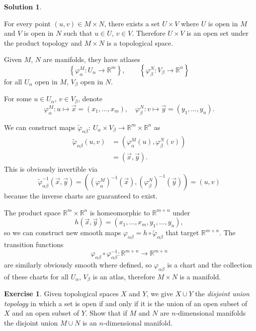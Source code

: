 \documentclass[11pt, a4paper]{report}
\theoremstyle{definition}
\newtheorem{exercise}{Exercise}[part]
\newtheorem{solution}{Solution}[part]
\newenvironment{ex}{\begin{exercise}}{\end{exercise}\pagebreak[1]}
\newenvironment{sol}{\begin{solution}}{\end{solution}\pagebreak[3]}
\begin{document}
\begin{sol}\label{sol:producttopology}

For every point $(u, v) \in M \times N$, there exists a set $U \times V$ where $U$ is open in $M$ and $V$ is open in $N$ such that $u \in U$, $v \in V$.
Therefore $U \times V$ is an open set under the product topology and $M \times N$ is a topological space.

Given $M$, $N$ are manifolds, they have atlases
\[
    \left\{\varphi^M_\alpha: U_\alpha \to \mathbb{R}^m \right\}, \qquad
    \left\{\varphi^N_\beta: V_\beta \to \mathbb{R}^n \right\}
\]
for all $U_\alpha$ open in $M$, $V_\beta$ open in $N$.

For some $u \in U_\alpha$, $v \in V_\beta$, denote
\[
    \varphi^M_\alpha: u \mapsto \vec{x} = (x_1, \ldots, x_m), \quad
    \varphi^N_\beta: v \mapsto \vec{y} = (y_1, \ldots, y_n).
\]

We can construct maps $\tilde{\varphi}_{\alpha\beta}:\ U_\alpha \times V_\beta \to \mathbb{R}^m \times \mathbb{R}^n$ as
\begin{align*}
    \tilde{\varphi}_{\alpha\beta} (u, v) &= \left(\varphi^M_\alpha(u), \varphi^N_\beta(v)\right) \\
        &= (\vec{x}, \vec{y}).
\end{align*}
This is obviously invertible via
\[
    \tilde{\varphi}_{\alpha\beta}^{-1}(\vec{x}, \vec{y}) = \left({(\varphi^M_\alpha)}^{-1}(\vec{x}), {(\varphi^N_\beta)}^{-1}(\vec{y})\right) = (u, v)
\]
because the inverse charts are guaranteed to exist.

The product space $\mathbb{R}^m \times \mathbb{R}^n$ is homeomorphic to $\mathbb{R}^{m + n}$ under
\[
    h(\vec{x}, \vec{y}) = (x_1, \ldots, x_m, y_1, \ldots, y_n),
\]
so we can construct new smooth maps $\varphi_{\alpha\beta} = h \circ \tilde{\varphi}_{\alpha\beta}$ that target $\mathbb{R}^{m + n}$.
The transition functions
\[
    \varphi_{\alpha\beta} \circ \varphi_{\alpha\beta}^{-1}: \mathbb{R}^{m + n} \to \mathbb{R}^{m + n}
\]
are similarly obviously smooth where defined, so $\varphi_{\alpha\beta}$ is a chart and the collection of these charts for all $U_\alpha$, $V_\beta$ is an atlas, therefore $M \times N$ is a manifold.

\end{sol}

\begin{ex}

Given topological spaces $X$ and $Y$, we give $X \cup Y$ the \emph{disjoint union topology} in which a set is open if and only if it is the union of an open subset of $X$ and an open subset of $Y$.
Show that if $M$ and $N$ are $n$-dimensional manifolds the disjoint union $M \cup N$ is an $n$-dimensional manifold.

\end{ex}
\end{document}
